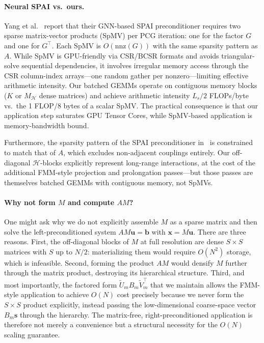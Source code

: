 \documentclass[acmtog,anonymous,review]{acmart}
\begin{document}
\paragraph{Neural SPAI vs.\ ours.}
Yang et al.~\cite{yang2025sparse} report that their GNN-based SPAI preconditioner requires two
sparse matrix-vector products (SpMV) per PCG iteration: one for the factor $G$ and one for
$G^\top$.  Each SpMV is $O(\mathrm{nnz}(G))$ with the same sparsity pattern as $A$.  While SpMV
is GPU-friendly via CSR/BCSR formats and avoids triangular-solve sequential dependencies, it
involves irregular memory access through the CSR column-index arrays---one random gather per
nonzero---limiting effective arithmetic intensity.  Our batched GEMMs operate on contiguous
memory blocks ($K$ or $M_\mathcal{H}$ dense matrices) and achieve arithmetic intensity
$L_s / 2$ FLOPs/byte vs.\ the 1 FLOP/8 bytes of a scalar SpMV.  The practical consequence is
that our application step saturates GPU Tensor Cores, while SpMV-based application is
memory-bandwidth bound.

Furthermore, the sparsity pattern of the SPAI preconditioner in~\cite{yang2025sparse} is
constrained to match that of $A$, which excludes non-adjacent couplings entirely.  Our
off-diagonal $\mathcal{H}$-blocks explicitly represent long-range interactions, at the cost of
the additional FMM-style projection and prolongation passes---but those passes are themselves
batched GEMMs with contiguous memory, not SpMVs.

\paragraph{Why not form $M$ and compute $AM$?}
One might ask why we do not explicitly assemble $M$ as a sparse matrix and then solve the
left-preconditioned system $AM\mathbf{u} = \mathbf{b}$ with $\mathbf{x} = M\mathbf{u}$.  There
are three reasons.  First, the off-diagonal blocks of $M$ at full resolution are dense $S \times
S$ matrices with $S$ up to $N/2$: materializing them would require $O(N^2)$ storage, which is
infeasible.  Second, forming the product $AM$ would densify $M$ further through the matrix
product, destroying its hierarchical structure.  Third, and most importantly, the factored form
$\tilde{U}_m B_m \tilde{V}_m^\top$ that we maintain allows the FMM-style application to achieve
$O(N)$ cost precisely because we never form the $S \times S$ product explicitly, instead passing
the low-dimensional coarse-space vector $B_m \mathbf{s}$ through the hierarchy.  The matrix-free,
right-preconditioned application is therefore not merely a convenience but a structural necessity
for the $O(N)$ scaling guarantee.
\end{document}
